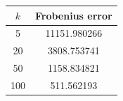 \begin{tabular}[12pt]{ |c| c| }
    \hline
    {$k$} & {Frobenius error}\\ 
    \hline
    5 &  11151.980266 \\
    \hline
    20 &  3808.753741 \\
    \hline
    50 &  1158.834821 \\
    \hline
    100 & 511.562193 \\
    \hline
\end{tabular}
